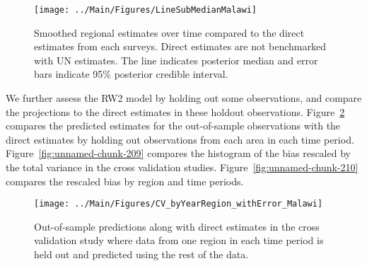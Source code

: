 \documentclass[12pt]{article}\usepackage[]{graphicx}\usepackage[]{color}
\newenvironment{knitrout}{}{} %
\begin{document}
\begin{knitrout}
\color{fgcolor}\begin{figure}[bht]

{\centering \texttt{[image: ../Main/Figures/LineSubMedianMalawi]} 

}

\caption[Smoothed regional estimates over time compared to the direct estimates from each surveys]{Smoothed regional estimates over time compared to the direct estimates from each surveys. Direct estimates are not benchmarked with UN estimates. The line indicates posterior median and error bars indicate 95\% posterior credible interval.}\label{fig:unnamed-chunk-207}
\end{figure}


\end{knitrout}
We further assess the RW2 model by holding out some observations, and compare the projections to the direct estimates in these holdout observations. Figure~\ref{fig:unnamed-chunk-208} compares the predicted estimates for the out-of-sample observations  with the direct estimates by holding out observations from each area in each time period.  Figure~\ref{fig:unnamed-chunk-209} compares the histogram of the bias rescaled by the total variance in the cross validation studies. Figure~\ref{fig:unnamed-chunk-210} compares the rescaled bias by region and time periods.



 
\begin{knitrout}
\color{fgcolor}\begin{figure}[bht]

{\centering \texttt{[image: ../Main/Figures/CV\_byYearRegion\_withError\_Malawi]} 

}

\caption[Out-of-sample predictions along with direct estimates in the cross validation study where data from one region in each time period is held out and predicted using the rest of the data]{Out-of-sample predictions along with direct estimates in the cross validation study where data from one region in each time period is held out and predicted using the rest of the data.}\label{fig:unnamed-chunk-208}
\end{figure}


\end{knitrout}
\end{document}
